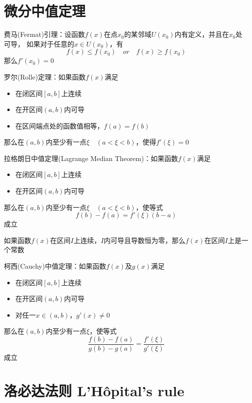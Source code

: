 \documentclass[UTF8]{ctexart}
\begin{document}
\section*{微分中值定理}

\bigskip

费马(Fermat)引理：设函数$f(x)$在点$x_0$的某邻域$U(x_0)$内有定义，并且在$x_0$处可导，
如果对于任意的$x\in U(x_0)$，有
\[ f(x)\le f(x_0)\quad or \quad f(x)\ge f(x_0) \]
那么$f'(x_0)=0$

\bigskip

\bigskip

罗尔(Rolle)定理：如果函数$f(x)$满足
\begin{itemize}
  \item 在闭区间$[a,b]$上连续
  \item 在开区间$(a,b)$内可导
  \item 在区间端点处的函数值相等，$f(a)=f(b)$
\end{itemize}
那么在$(a,b)$内至少有一点$\xi\quad(a<\xi<b)$，使得$f'(\xi)=0$

\bigskip

\bigskip

拉格朗日中值定理(Lagrange Median Theorem)：如果函数$f(x)$满足
\begin{itemize}
  \item 在闭区间$[a,b]$上连续
  \item 在开区间$(a,b)$内可导
\end{itemize}
那么在$(a,b)$内至少有一点$\xi\quad(a<\xi<b)$，使等式
\[ f(b)-f(a)=f'(\xi)(b-a) \]
成立

\bigskip

\bigskip

如果函数$f(x)$在区间$I$上连续，$I$内可导且导数恒为零，那么$f(x)$在区间$I$上是一个常数

\bigskip

\bigskip

柯西(Cauchy)中值定理：如果函数$f(x)$及$g(x)$满足
\begin{itemize}
  \item 在闭区间$[a,b]$上连续
  \item 在开区间$(a,b)$内可导
  \item 对任一$x\in(a,b)$，$g'(x)\ne0$
\end{itemize}
那么在$(a,b)$内至少有一点$\xi$，使等式
\[ \frac{f(b)-f(a)}{g(b)-g(a)}=\frac{f'(\xi)}{g'(\xi)} \]
成立
\bigskip
\bigskip

\section*{洛必达法则 L'Hôpital's rule}
\end{document}
